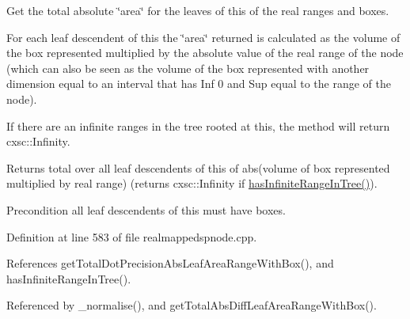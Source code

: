 \-Get the total absolute \char`\"{}area\char`\"{} for the leaves of this of the real ranges and boxes. 

\-For each leaf descendent of this the \char`\"{}area\char`\"{} returned is calculated as the volume of the box represented multiplied by the absolute value of the real range of the node (which can also be seen as the volume of the box represented with another dimension equal to an interval that has \-Inf 0 and \-Sup equal to the range of the node).

\-If there are an infinite ranges in the tree rooted at this, the method will return cxsc\-::\-Infinity.

\begin{DoxyReturn}{\-Returns}
total over all leaf descendents of this of abs(volume of box represented multiplied by real range) (returns cxsc\-::\-Infinity if \hyperlink{classsubpavings_1_1RealMappedSPnode_a738f4ef504214f9dd3a533f052f6d4cb}{has\-Infinite\-Range\-In\-Tree()}). 
\end{DoxyReturn}
\begin{DoxyPrecond}{\-Precondition}
all leaf descendents of this must have boxes. 
\end{DoxyPrecond}


\-Definition at line 583 of file realmappedspnode.\-cpp.



\-References get\-Total\-Dot\-Precision\-Abs\-Leaf\-Area\-Range\-With\-Box(), and has\-Infinite\-Range\-In\-Tree().



\-Referenced by \-\_\-normalise(), and get\-Total\-Abs\-Diff\-Leaf\-Area\-Range\-With\-Box().


